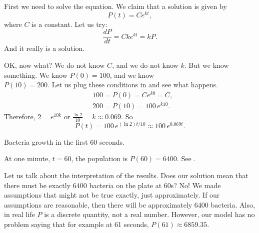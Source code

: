 \documentclass{ximera}
\begin{document}
\begin{exampleSol}
    First we need to solve the equation.  We claim that a solution is given by
    \begin{equation*}
        P(t) = C e^{kt} ,
    \end{equation*}
    where $C$ is a constant.  Let us try:
    \begin{equation*}
        \frac{dP}{dt} = C k e^{kt} = k P .
    \end{equation*}
    And it really is a solution.
    
    OK\@, now what?  We do not know $C$, and we do not know $k$.  But we know something.  We know $P(0) = 100$, and we know \\
    
    $P(10) = 200$.  Let us plug these conditions in and see what happens.
    \begin{align*}
        & 100 = P(0) = C e^{k0} = C ,\\
        & 200 = P(10) = 100 \, e^{k10} .
    \end{align*}
    Therefore, $2 = e^{10k}$ or $\frac{\ln 2}{10} = k \approx 0.069$. So 
    \begin{equation*}
        P(t) = 100 \, e^{(\ln 2) t / 10} \approx 100 \, e^{0.069 t} .
    \end{equation*}
    
    \begin{mywrapfig}{3.35in}
        \capstart
        \caption{Bacteria growth in the first 60 seconds.\label{intro:plotbactfig}}
    \end{mywrapfig}
    
    
    
    At one minute, $t=60$, the population is $P(60) = 6400$.  See .
    
    Let us talk about the interpretation of the results.  Does our solution mean that there must be exactly 6400 bacteria on the plate at 60s?  No!  We made assumptions that might not be true exactly, just approximately. If our assumptions are reasonable, then there will be approximately 6400 bacteria. Also, in real life $P$ is a discrete quantity, not a real number.  However, our model has no problem saying that for example at 61 seconds, $P(61) \approx 6859.35$.
\end{exampleSol}
\end{document}
